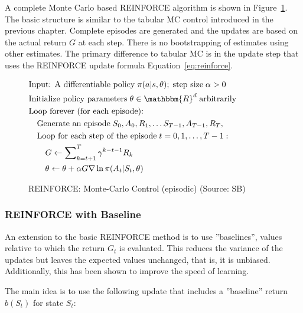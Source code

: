 A complete Monte Carlo based REINFORCE algorithm is shown in Figure~\ref{fig:reinforce}. The basic structure is similar to the tabular MC control introduced in the previous chapter. Complete episodes are generated and the updates are based on the actual return $G$ at each step. There is no bootstrapping of estimates using other estimates. The primary difference to tabular MC is in the update step that uses the REINFORCE update formula Equation~\ref{eq:reinforce}.

\begin{figure}
\small
\begin{tcolorbox}[colback=code]
\vspace{-\baselineskip}
\begin{align*}
& \text{Input: A differentiable policy}\;\pi(a | s, \theta);\;\text{step size}\; \alpha > 0 \\
& \text{Initialize policy parameters}\; \theta \in \mathbbm{R}^d\;\text{arbitrarily} \\
& \text{Loop forever (for each episode):} \\
& \quad \text{Generate an episode}\; S_0, A_0, R_1, \ldots S_{T-1}, A_{T-1}, R_T, \hspace{1in} \\
& \quad \text{Loop for each step of the episode}\;t=0, 1, \ldots, T-1:\\
& \quad \quad G \leftarrow \sum\nolimits_{k=t+1}^T \gamma^{k - t - 1}R_k \\
& \quad \quad \theta \leftarrow \theta + \alpha G \nabla \ln \pi(A_t | S_t, \theta)
\end{align*}
\end{tcolorbox}
\caption[REINFORCE: Monte-Carlso Control]{REINFORCE: Monte-Carlo Control (episodic) (Source: SB)}
\label{fig:reinforce}
\end{figure}

\subsubsection*{REINFORCE with Baseline}

An extension to the basic REINFORCE method is to use ''baselines'', values relative to which the return $G_t$ is evaluated. This reduces the variance of the updates but leaves the expected values unchanged, that is, it is unbiased. Additionally, this has been shown to improve the speed of learning. 

The main idea is to use the following update that includes a ''baseline'' return $b(S_t)$ for state $S_t$:

